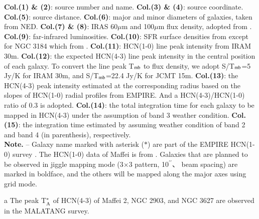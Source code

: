 \documentclass[legal,11pt]{article}
\def\arcsec {\hbox{$^{\prime\prime}$}}
\def\,{\thinspace}
\begin{document}
\begin{table}
\begin{threeparttable}[b]
\begin{tabular}{llrrccccccccccl}
\hline
\end{tabular}

\begin{tablenotes}
% 
{\bf Col.(1) \& (2)}: source number and name. {\bf Col.(3) \& (4)}: source coordinate. 
% 
{\bf Col.(5)}: source distance. 
% 
{\bf Col.(6)}: major and minor diameters of galaxies, taken from NED. 
% 
{\bf Col.(7) \& (8)}:  IRAS 60$\mu$m and 100$\mu$m flux density, adopted from \citet{smk03}. 
% 
{\bf Col.(9)}: far-infrared luminosities. 
% 
{\bf Col.(10)}: SFR surface densities from \cite{lgg2015} except for NGC 3184 which from \cite{Leroy2013}. 
% 
{\bf Col.(11)}: HCN(1-0)
line peak intensity from IRAM 30m. 
% 
{\bf Col.(12)}: the expected HCN(4-3) line peak intensity in the central position of each galaxy. To convert the line peak T$_{\rm mb}$ to flux density, we adopt S/T$_{\rm mb}$=5 Jy/K for IRAM 30m, and S/T$_{\rm mb}$=22.4 Jy/K for JCMT 15m. 
% 
{\bf Col.(13)}: the HCN(4-3) peak intensity estimated at the corresponding radius based on the slopes of HCN(1-0) radial profiles from EMPIRE. And a HCN(4-3)/HCN(1-0) ratio of 0.3 is adopted.
% 
{\bf Col.(14)}: the total integration time for each galaxy to be mapped in HCN(4-3) under the assumption of band 3 weather condition.
% 
{\bf Col.(15)}: the integration time estimated 
by assuming weather condition of band 2 and band 4 (in parenthesis), respectively. \\

{\bf Note.} -- Galaxy name marked with asterisk ($\ast$) are part of the EMPIRE HCN(1-0) survey \citep{Jimenez-Donaire:2019}. The HCN(1-0) data of Maffei\,2 is from \citet{Nguyen1992}. Galaxies that are planned to be observed in jiggle mapping mode (3$\times$3 pattern, 10\arcsec、 beam spacing) are marked in boldface, and the others will be mapped along the major axes using grid mode.

\item[a]{The peak T$_{\rm A}^*$ of HCN(4-3) of Maffei 2, NGC 2903, and NGC 3627 are observed in the MALATANG survey.}

\end{tablenotes}
\end{threeparttable}

\end{table}





\end{document}

